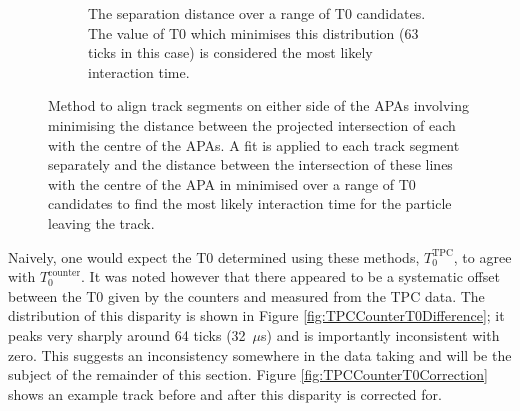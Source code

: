 \begin{figure}[p]
\begin{subfigure}[t]{0.48\linewidth}
    \caption{The separation distance over a range of T0 candidates.  The value of T0 which minimises this distribution (63 ticks in this case) is considered the most likely interaction time.}
    \label{fig:APACrossingAlignmentSeparationMin}
  \end{subfigure}
  \caption[Method to align track segments on either side of the APAs involving minimising the distance between the projected intersection of each with the centre of the APAs.]{Method to align track segments on either side of the APAs involving minimising the distance between the projected intersection of each with the centre of the APAs.  A fit is applied to each track segment separately and the distance between the intersection of these lines with the centre of the APA in minimised over a range of T0 candidates to find the most likely interaction time for the particle leaving the track.}
  \label{fig:APACrossingAlignmentSeparation}

\end{figure}

Naively, one would expect the T0 determined using these methods, $T_0^{\mathrm{TPC}}$, to agree with $T_0^{\mathrm{counter}}$.  It was noted however that there appeared to be a systematic offset between the T0 given by the counters and measured from the TPC data.  The distribution of this disparity is shown in Figure \ref{fig:TPCCounterT0Difference}; it peaks very sharply around 64 ticks (32~$\mu$s) and is importantly inconsistent with zero.  This suggests an inconsistency somewhere in the data taking and will be the subject of the remainder of this section.  Figure \ref{fig:TPCCounterT0Correction} shows an example track before and after this disparity is corrected for.

